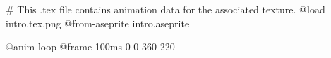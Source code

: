 # This .tex file contains animation data for the associated texture.
@load intro.tex.png
@from-aseprite intro.aseprite

@anim loop
	@frame 100ms 0 0 360 220
